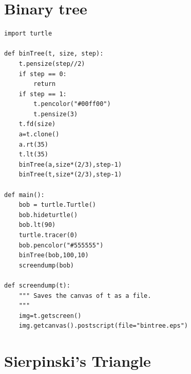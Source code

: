 \documentclass[titlepage]{article}
\begin{document}
\section{Binary tree}
\label{app:bintree}
\begin{verbatim}
import turtle

def binTree(t, size, step):
    t.pensize(step//2)
    if step == 0:
        return
    if step == 1:
        t.pencolor("#00ff00")
        t.pensize(3)
    t.fd(size)
    a=t.clone()
    a.rt(35)
    t.lt(35)
    binTree(a,size*(2/3),step-1)
    binTree(t,size*(2/3),step-1)

def main():
    bob = turtle.Turtle()
    bob.hideturtle()
    bob.lt(90)
    turtle.tracer(0)
    bob.pencolor("#555555")
    binTree(bob,100,10)
    screendump(bob)
    
def screendump(t):
    """ Saves the canvas of t as a file.
    """
    img=t.getscreen()
    img.getcanvas().postscript(file="bintree.eps")
\end{verbatim}

\section{Sierpinski's Triangle}
\label{app:sierpinski}
\inputminted{python}{sierpinsky-triangle.py}
\end{document}
